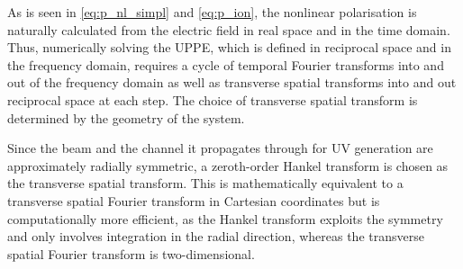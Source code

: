 \documentclass[a4paper]{jpconf}
\begin{document}
As is seen in \eqref{eq:p_nl_simpl} and \eqref{eq:p_ion}, the nonlinear polarisation is naturally calculated from the electric field in real space and in the time domain. Thus, numerically solving the UPPE, which is defined in reciprocal space and in the frequency domain, requires a cycle of temporal Fourier transforms into and out of the frequency domain as well as transverse spatial transforms into and out reciprocal space at each step. The choice of transverse spatial transform is determined by the geometry of the system. \par 
Since the beam and the channel it propagates through for UV generation are approximately radially symmetric, a zeroth-order Hankel transform is chosen as the transverse spatial transform. This is mathematically equivalent to a  transverse spatial Fourier transform in Cartesian coordinates but is computationally more efficient, as the Hankel transform exploits the symmetry and only involves integration in the radial direction, whereas the transverse spatial Fourier transform is two-dimensional. 
 
\end{document}
